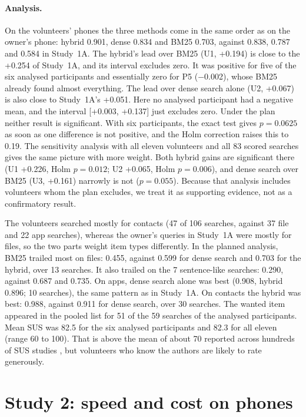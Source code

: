 \documentclass[11pt,a4paper]{article}
\begin{document}
\paragraph{Analysis.} On the volunteers' phones the three methods come in the same order as on the owner's phone: hybrid 0.901, dense 0.834 and BM25 0.703, against 0.838, 0.787 and 0.584 in Study~1A. The hybrid's lead over BM25 (U1, +0.194) is close to the +0.254 of Study~1A, and its interval excludes zero. It was positive for five of the six analysed participants and essentially zero for P5 ($-$0.002), whose BM25 already found almost everything. The lead over dense search alone (U2, +0.067) is also close to Study~1A's +0.051. Here no analysed participant had a negative mean, and the interval [+0.003, +0.137] just excludes zero. Under the plan neither result is significant. With six participants, the exact test gives $p=0.0625$ as soon as one difference is not positive, and the Holm correction raises this to 0.19. The sensitivity analysis with all eleven volunteers and all 83 scored searches gives the same picture with more weight. Both hybrid gains are significant there (U1 +0.226, Holm $p=0.012$; U2 +0.065, Holm $p=0.006$), and dense search over BM25 (U3, +0.161) narrowly is not ($p=0.055$). Because that analysis includes volunteers whom the plan excludes, we treat it as supporting evidence, not as a confirmatory result.

The volunteers searched mostly for contacts (47 of 106 searches, against 37 file and 22 app searches), whereas the owner's queries in Study~1A were mostly for files, so the two parts weight item types differently. In the planned analysis, BM25 trailed most on files: 0.455, against 0.599 for dense search and 0.703 for the hybrid, over 13 searches. It also trailed on the 7 sentence-like searches: 0.290, against 0.687 and 0.735. On apps, dense search alone was best (0.908, hybrid 0.896; 10 searches), the same pattern as in Study~1A. On contacts the hybrid was best: 0.988, against 0.911 for dense search, over 30 searches. The wanted item appeared in the pooled list for 51 of the 59 searches of the analysed participants. Mean SUS was 82.5 for the six analysed participants and 82.3 for all eleven (range 60 to 100). That is above the mean of about 70 reported across hundreds of SUS studies \citep{bangor2008sus}, but volunteers who know the authors are likely to rate generously.

\section{Study 2: speed and cost on phones}\label{sec:s2}
\end{document}
